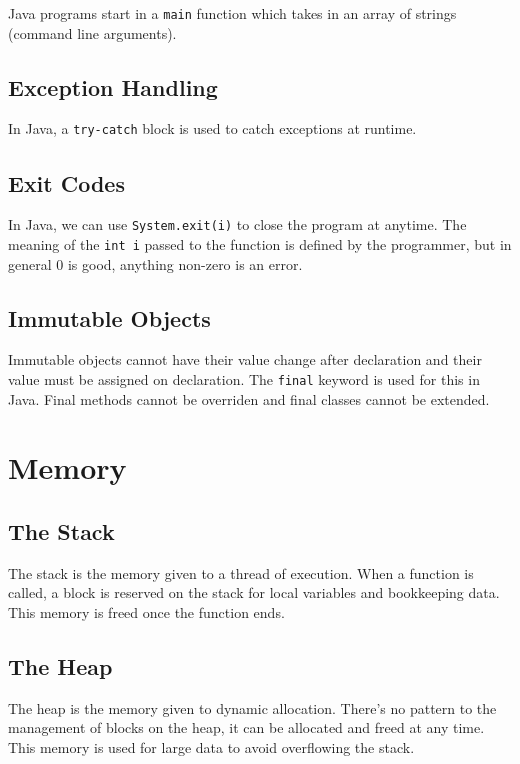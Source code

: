 \documentclass[a4paper, 12pt, twoside]{article}
\begin{document}
Java programs start in a \texttt{main} function which takes in
an array of strings (command line arguments).

\subsection{Exception Handling}

In Java, a \texttt{try-catch} block is used to catch exceptions
at runtime.

\subsection{Exit Codes}

In Java, we can use \texttt{System.exit(i)} to close the program at
anytime. The meaning of the \texttt{int i} passed to the function
is defined by the programmer, but in general 0 is good, anything
non-zero is an error.

\subsection{Immutable Objects}

Immutable objects cannot have their value change after declaration
and their value must be assigned on declaration. The \texttt{final}
keyword is used for this in Java. Final methods cannot be overriden
and final classes cannot be extended.

\section{Memory}

\subsection{The Stack}

The stack is the memory given to a thread of execution.
When a function is called, a block is reserved on the stack for
local variables and bookkeeping data. This memory is freed once
the function ends.

\subsection{The Heap}

The heap is the memory given to dynamic allocation. There's no
pattern to the management of blocks on the heap, it can be
allocated and freed at any time. This memory is used for large
data to avoid overflowing the stack.
\end{document}
